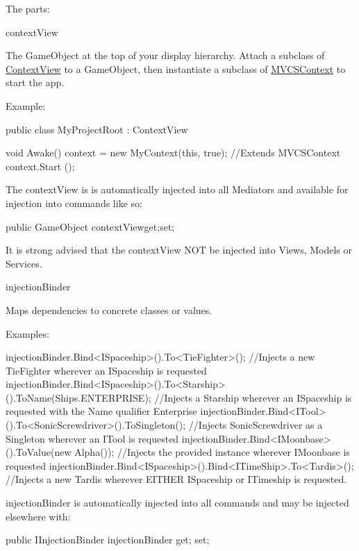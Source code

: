 The parts\-: 
\begin{DoxyItemize}
\item context\-View

The Game\-Object at the top of your display hierarchy. Attach a subclass of \hyperlink{classstrange_1_1extensions_1_1context_1_1impl_1_1_context_view}{Context\-View} to a Game\-Object, then instantiate a subclass of \hyperlink{classstrange_1_1extensions_1_1context_1_1impl_1_1_m_v_c_s_context}{M\-V\-C\-S\-Context} to start the app.

Example\-: \begin{DoxyVerb}public class MyProjectRoot : ContextView
{

    void Awake()
    {
        context = new MyContext(this, true); //Extends MVCSContext
        context.Start ();
    }
}
\end{DoxyVerb}


The context\-View is is automatically injected into all Mediators and available for injection into commands like so\-: \begin{DoxyVerb}
public GameObject contextView{get;set;}
\end{DoxyVerb}


It is strong advised that the context\-View N\-O\-T be injected into Views, Models or Services.


\item injection\-Binder

Maps dependencies to concrete classes or values.

Examples\-: \begin{DoxyVerb}injectionBinder.Bind<ISpaceship>().To<TieFighter>(); //Injects a new TieFighter wherever an ISpaceship is requested
injectionBinder.Bind<ISpaceship>().To<Starship>().ToName(Ships.ENTERPRISE); //Injects a Starship wherever an ISpaceship is requested with the Name qualifier Enterprise
injectionBinder.Bind<ITool>().To<SonicScrewdriver>().ToSingleton(); //Injects SonicScrewdriver as a Singleton wherever an ITool is requested
injectionBinder.Bind<IMoonbase>().ToValue(new Alpha()); //Injects the provided instance wherever IMoonbase is requested
injectionBinder.Bind<ISpaceship>().Bind<ITimeShip>.To<Tardis>(); //Injects a new Tardis wherever EITHER ISpaceship or ITimeship is requested.
\end{DoxyVerb}


{\ttfamily injection\-Binder} is automatically injected into all commands and may be injected elsewhere with\-: \begin{DoxyVerb}[Inject]
public IInjectionBinder injectionBinder{ get; set;}
\end{DoxyVerb}




\end{DoxyItemize}
